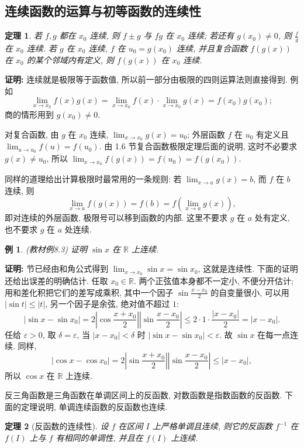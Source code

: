 \documentclass[UTF8,openany]{ctexbook}
\theoremstyle{chinesetextbook}
\newtheorem{example}{例}[section]
\newtheorem{theorem}{定理}[section]
\newenvironment{cnproof}{\par\indent\textbf{证明:} \ignorespaces}{\par}
\begin{document}
\subsection{连续函数的运算与初等函数的连续性}
\begin{theorem}
若 $f,g$ 都在 $x_0$ 连续, 则 $f\pm g$ 与 $fg$ 在 $x_0$ 连续; 若还有 $g(x_0)\ne0$, 则 $\displaystyle\frac fg$ 在 $x_0$ 连续. 若 $g$ 在 $x_0$ 连续, $f$ 在 $u_0=g(x_0)$ 连续, 并且复合函数 $f(g(x))$ 在 $x_0$ 的某个邻域内有定义, 则 $f(g(x))$ 在 $x_0$ 连续.
\end{theorem}
\begin{cnproof}
连续就是极限等于函数值, 所以前一部分由极限的四则运算法则直接得到. 例如
\[
\lim_{x\to x_0}f(x)g(x)=\lim_{x\to x_0}f(x)\cdot\lim_{x\to x_0}g(x)=f(x_0)g(x_0);
\]
商的情形用到 $g(x_0)\ne0$.

对复合函数, 由 $g$ 在 $x_0$ 连续, $\displaystyle\lim_{x\to x_0}g(x)=u_0$; 外层函数 $f$ 在 $u_0$ 有定义且 $\displaystyle\lim_{u\to u_0}f(u)=f(u_0)$. 由 1.6 节复合函数极限定理后面的说明, 这时不必要求 $g(x)\ne u_0$, 所以 $\displaystyle\lim_{x\to x_0}f(g(x))=f(u_0)=f(g(x_0))$.
\end{cnproof}
同样的道理给出计算极限时最常用的一条规则: 若 $\displaystyle\lim_{x\to a}g(x)=b$, 而 $f$ 在 $b$ 连续, 则
\[
\lim_{x\to a}f(g(x))=f(b)=f\left(\lim_{x\to a}g(x)\right),
\]
即对连续的外层函数, 极限号可以移到函数的内部. 这里不要求 $g$ 在 $a$ 处有定义, 也不要求 $g$ 在 $a$ 处连续.
\begin{example}\label{ex:8-3}
\textnormal{(教材例8.3)} 证明 $\sin x$ 在 $\mathbb R$ 上连续.
\end{example}
\begin{cnproof}
1.6 节已经由和角公式得到 $\displaystyle\lim_{x\to x_0}\sin x=\sin x_0$, 这就是连续性. 下面的证明还给出误差的明确估计. 任取 $x_0\in\mathbb R$. 两个正弦值本身都不一定小, 不便分开估计; 用和差化积把它们的差写成乘积, 其中一个因子 $\displaystyle\sin\frac{x-x_0}2$ 的自变量很小, 可以用 $|\sin t|\le|t|$, 另一个因子是余弦, 绝对值不超过 $1$:
\[
|\sin x-\sin x_0|=2\left|\cos\frac{x+x_0}2\right|\left|\sin\frac{x-x_0}2\right|\le2\cdot1\cdot\frac{|x-x_0|}2=|x-x_0|.
\]
任给 $\varepsilon>0$, 取 $\delta=\varepsilon$, 当 $|x-x_0|<\delta$ 时 $|\sin x-\sin x_0|<\varepsilon$. 故 $\sin x$ 在每一点连续. 同样,
\[
|\cos x-\cos x_0|=2\left|\sin\frac{x+x_0}2\right|\left|\sin\frac{x-x_0}2\right|\le|x-x_0|,
\]
所以 $\cos x$ 在 $\mathbb R$ 上连续.
\end{cnproof}
反三角函数是三角函数在单调区间上的反函数, 对数函数是指数函数的反函数. 下面的定理说明, 单调连续函数的反函数也连续.
\begin{theorem}[反函数的连续性]
设 $f$ 在区间 $I$ 上严格单调且连续, 则它的反函数 $f^{-1}$ 在 $f(I)$ 上与 $f$ 有相同的单调性, 并且在 $f(I)$ 上连续.
\end{theorem}
\end{document}
